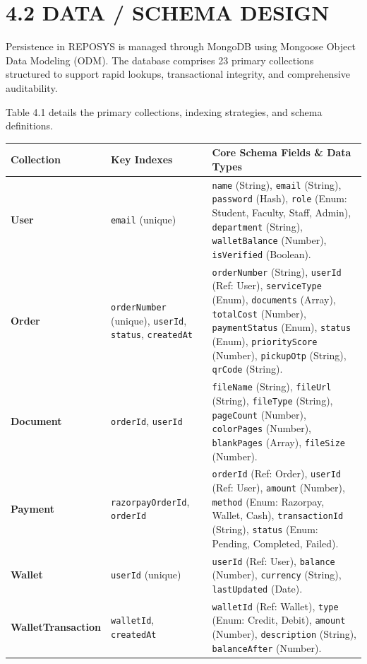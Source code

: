 \documentclass[12pt,a4paper,oneside]{report}
\begin{document}
\section{4.2 DATA / SCHEMA DESIGN}
Persistence in REPOSYS is managed through MongoDB using Mongoose Object Data Modeling (ODM). The database comprises 23 primary collections structured to support rapid lookups, transactional integrity, and comprehensive auditability.

Table 4.1 details the primary collections, indexing strategies, and schema definitions.

\begin{table}[H]
\centering
\small
\begin{tabularx}{\textwidth}{|p{1.1in}|p{1.1in}|X|}
\hline
\textbf{Collection} & \textbf{Key Indexes} & \textbf{Core Schema Fields \& Data Types} \\ \hline
\textbf{User} & \texttt{email} (unique) & \texttt{name} (String), \texttt{email} (String), \texttt{password} (Hash), \texttt{role} (Enum: Student, Faculty, Staff, Admin), \texttt{department} (String), \texttt{walletBalance} (Number), \texttt{isVerified} (Boolean). \\ \hline
\textbf{Order} & \texttt{orderNumber} (unique), \texttt{userId}, \texttt{status}, \texttt{createdAt} & \texttt{orderNumber} (String), \texttt{userId} (Ref: User), \texttt{serviceType} (Enum), \texttt{documents} (Array), \texttt{totalCost} (Number), \texttt{paymentStatus} (Enum), \texttt{status} (Enum), \texttt{priorityScore} (Number), \texttt{pickupOtp} (String), \texttt{qrCode} (String). \\ \hline
\textbf{Document} & \texttt{orderId}, \texttt{userId} & \texttt{fileName} (String), \texttt{fileUrl} (String), \texttt{fileType} (String), \texttt{pageCount} (Number), \texttt{colorPages} (Number), \texttt{blankPages} (Array), \texttt{fileSize} (Number). \\ \hline
\textbf{Payment} & \texttt{razorpayOrderId}, \texttt{orderId} & \texttt{orderId} (Ref: Order), \texttt{userId} (Ref: User), \texttt{amount} (Number), \texttt{method} (Enum: Razorpay, Wallet, Cash), \texttt{transactionId} (String), \texttt{status} (Enum: Pending, Completed, Failed). \\ \hline
\textbf{Wallet} & \texttt{userId} (unique) & \texttt{userId} (Ref: User), \texttt{balance} (Number), \texttt{currency} (String), \texttt{lastUpdated} (Date). \\ \hline
\textbf{WalletTransaction} & \texttt{walletId}, \texttt{createdAt} & \texttt{walletId} (Ref: Wallet), \texttt{type} (Enum: Credit, Debit), \texttt{amount} (Number), \texttt{description} (String), \texttt{balanceAfter} (Number). \\ \hline

\end{tabularx}
\end{table}
\end{document}
